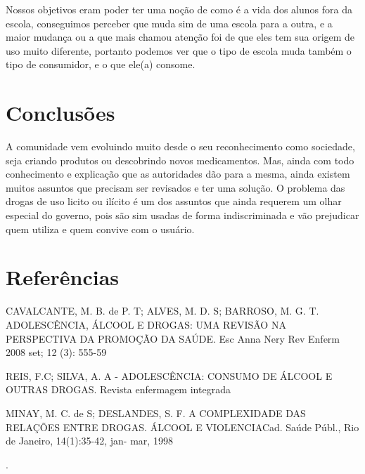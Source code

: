 \documentclass[article,12pt,onesidea,4paper,english,brazil]{abntex2}
\begin{document}
	Nossos objetivos eram poder ter uma noção de como é a vida dos alunos fora da escola, conseguimos perceber que muda sim de uma escola para a outra, e a maior mudança ou a que mais chamou atenção foi de que eles tem sua origem de uso muito diferente, portanto podemos ver que o tipo de escola muda também o tipo de consumidor, e o que ele(a) consome.
	\section*{Conclusões}
	
A comunidade vem evoluindo muito desde o seu reconhecimento como sociedade, seja criando produtos ou descobrindo novos medicamentos. Mas, ainda com todo conhecimento e explicação que as autoridades dão para a mesma, ainda existem muitos assuntos que precisam ser revisados e ter uma solução. O problema das drogas de uso licito ou ilícito é um dos assuntos que ainda requerem um olhar especial do governo, pois são sim usadas de forma indiscriminada e vão prejudicar quem utiliza e quem convive com o usuário.
	

	\section*{Referências}
	
	\noindent CAVALCANTE, M. B. de P. T; ALVES, M. D. S; BARROSO, M. G. T. ADOLESCÊNCIA, ÁLCOOL E DROGAS: UMA REVISÃO NA PERSPECTIVA DA
	PROMOÇÃO DA SAÚDE. Esc Anna Nery Rev Enferm 2008 set; 12 (3): 555-59
	
	\noindent REIS, F.C; SILVA, A. A - ADOLESCÊNCIA: CONSUMO DE ÁLCOOL E
	OUTRAS DROGAS. Revista enfermagem integrada
	
	\noindent MINAY, M. C. de S; DESLANDES, S. F. A COMPLEXIDADE DAS RELAÇÕES
	ENTRE DROGAS. ÁLCOOL E VIOLENCIACad. Saúde Públ., Rio de Janeiro, 14(1):35-42, jan- mar, 1998
	
	.
	
\end{document}

